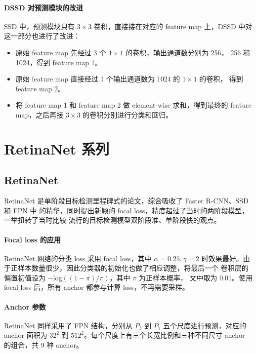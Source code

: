 \paragraph{DSSD 对预测模块的改进}
SSD 中，预测模块只有 $3 \times 3$ 卷积，直接接在对应的 feature map 上，DSSD 中对
这一部分也进行了改进：

\begin{itemize}
  \item 原始 feature map 先经过 3 个 $1 \times 1$ 的卷积，输出通道数分别为 256，
    256 和 1024，得到 feature map 1。
  \item 原始 feature map 直接经过 1 个输出通道数为 1024 的 $1 \times 1$ 的卷积，
    得到 feature map 2。
  \item 将 feature map 1 和 feature map 2 做 element-wise 求和，得到最终的
    feature map，之后再接 $3 \times 3$ 的卷积分别进行分类和回归。
\end{itemize}

\section{RetinaNet 系列}

\subsection{RetinaNet}
\label{sub:RetinaNet}

RetinaNet 是单阶段目标检测里程碑式的论文，综合吸收了 Faster R-CNN、SSD 和 FPN 中
的精华，同时提出新颖的 focal loss，精度超过了当时的两阶段模型，一举扭转了当时比较
流行的目标检测模型双阶段准、单阶段快的观点。

\paragraph{Focal loss 的应用}
RetinaNet 网络的分类 loss 采用 focal loss，其中 $\alpha = 0.25, \gamma
= 2$ 时效果最好。由于正样本数量很少，因此分类器的初始化也做了相应调整，将最后一个
卷积层的偏置初值设为 $-\mathrm{log}((1 - \pi)/ \pi)$，其中 $\pi$ 为正样本概率，
文中取为 0.01。使用 focal loss 后，所有 anchor 都参与计算 loss，不再需要采样。

\paragraph{Anchor 参数}
RetinaNet 同样采用了 FPN 结构，分别从 $P_3$ 到 $P_7$ 五个尺度进行预测，对应的
anchor 面积为 $32^2$ 到 $512^2$。每个尺度上有三个长宽比例和三种不同尺寸 anchor
的组合，共 9 种 anchor。

